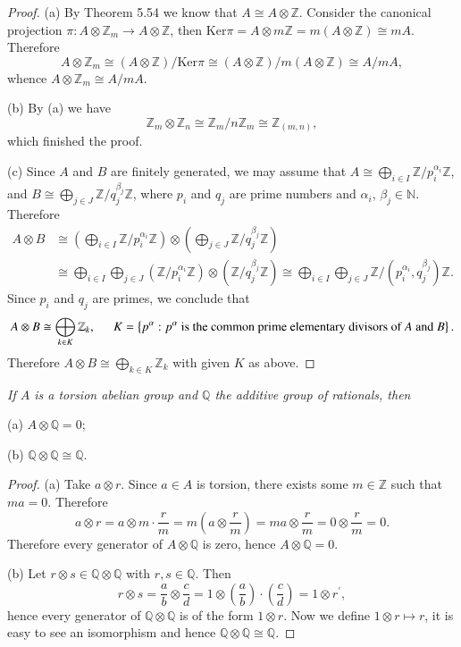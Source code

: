 \begin{proof}
(a) By Theorem 5.54 we know that $A\cong A\otimes\mathbb{Z}$. Consider the canonical projection $\pi:A\otimes\mathbb{Z}_m\to A\otimes\mathbb{Z}$, then $\mathrm{Ker}\pi=A\otimes m\mathbb{Z}=m(A\otimes\mathbb{Z})\cong mA$. Therefore 
$$
A\otimes \mathbb{Z} _m\cong \left( A\otimes \mathbb{Z} \right) /\mathrm{Ker}\pi \cong \left( A\otimes \mathbb{Z} \right) /m\left( A\otimes \mathbb{Z} \right) \cong A/mA,
$$
whence $A\otimes\mathbb{Z}_m\cong A/mA$.\par
(b) By (a) we have 
$$
\mathbb{Z} _m\otimes \mathbb{Z} _n\cong \mathbb{Z} _m/n\mathbb{Z} _m\cong \mathbb{Z} _{\left( m,n \right)},
$$
which finished the proof.\par
(c) Since $A$ and $B$ are finitely generated, we may assume that $A\cong\bigoplus_{i\in I}\mathbb{Z}/p_i^{\alpha_i}\mathbb{Z}$, and $B\cong\bigoplus_{j\in J}\mathbb{Z}/q_j^{\beta_j}\mathbb{Z}$, where $p_i$ and $q_j$ are prime numbers and $\alpha_i$, $\beta_j\in\mathbb{N}$. Therefore 
$$
\begin{aligned}
A\otimes B&\cong \left( \bigoplus_{i\in I}{\mathbb{Z} /p_{i}^{\alpha _i}\mathbb{Z}} \right) \otimes \left( \bigoplus_{j\in J}{\mathbb{Z} /q_{j}^{\beta _j}\mathbb{Z}} \right) 
\\
&\cong \bigoplus_{i\in I}{\bigoplus_{j\in J}{\left( \mathbb{Z} /p_{i}^{\alpha _i}\mathbb{Z} \right) \otimes \left( \mathbb{Z} /q_{j}^{\beta _j}\mathbb{Z} \right)}}\cong \bigoplus_{i\in I}{\bigoplus_{j\in J}{\mathbb{Z} /\left( p_{i}^{\alpha _i},q_{j}^{\beta _j} \right) \mathbb{Z}}}.
\end{aligned}
$$
Since $p_i$ and $q_j$ are primes, we conclude that 
$$
A\otimes B\cong \bigoplus_{k\in K}{\mathbb{Z} _k},\hspace{0.5cm}K=\left\{ p^{\alpha}:\text{$p^\alpha$ is the common prime elementary divisors of $A$ and $B$}\right\} .
$$
Therefore $A\otimes B\cong\bigoplus_{k\in K}\mathbb{Z}_k$ with given $K$ as above.
\end{proof}
\begin{problem}\em
If $A$ is a torsion abelian group and $\mathbb{Q}$ the additive group of rationals, then \par
(a) $A\otimes\mathbb{Q}=0$;\par
(b) $\mathbb{Q}\otimes\mathbb{Q}\cong\mathbb{Q}$.
\end{problem}
\begin{proof}
(a) Take $a\otimes r$. Since $a\in A$ is torsion, there exists some $m\in\mathbb{Z}$ such that $ma=0$. Therefore 
$$
a\otimes r=a\otimes m\cdot \frac{r}{m}=m\left( a\otimes \frac{r}{m} \right) =ma\otimes \frac{r}{m}=0\otimes \frac{r}{m}=0.
$$
Therefore every generator of $A\otimes\mathbb{Q}$ is zero, hence $A\otimes\mathbb{Q}=0$.\par
(b) Let $r\otimes s\in\mathbb{Q}\otimes\mathbb{Q}$ with $r,s\in\mathbb{Q}$. Then 
$$
r\otimes s=\frac{a}{b}\otimes \frac{c}{d}=1\otimes \left( \frac{a}{b} \right) \cdot \left( \frac{c}{d} \right) =1\otimes r^{\prime},
$$
hence every generator of $\mathbb{Q}\otimes\mathbb{Q}$ is of the form $1\otimes r$. Now we define $1\otimes r\mapsto r$, it is easy to see an isomorphism and hence $\mathbb{Q}\otimes\mathbb{Q}\cong\mathbb{Q}$.
\end{proof}
